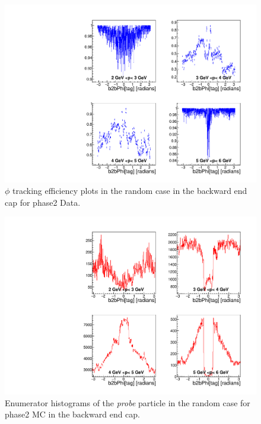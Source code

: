 \documentclass[a4paper,11pt,twosided,final,german,openbib,pdftex,listof=totoc,bibliography=totoc]{scrbook}
\begin{document}
\begin{appendix}
\begin{figure}[!htbp]
	\centering
	\includegraphics[width=\textwidth]{Plots/master/xPMPhiRandomEC_Data}
	\caption[Momentum $\phi$ Random Backward End Cap Efficiency Phase2 Data]{$\phi$ tracking efficiency plots in the random case in the backward end cap for phase2 Data.}
	\label{plt:PMPhiRandomEC_Data}
\end{figure}


\begin{figure}[!htbp]
	\centering
	\includegraphics[width=\textwidth]{Plots/master/xPMPhiRandomECE_MC}
	\caption[Momentum $\phi$ Random Backward End Cap Enumerator Histogram Phase2 MC]{Enumerator histograms of the \textit{probe} particle in the random case for phase2 MC in the backward end cap.}
	\label{plt:PMPhiRandomECE_MC}
\end{figure}


\end{appendix}
\end{document}
